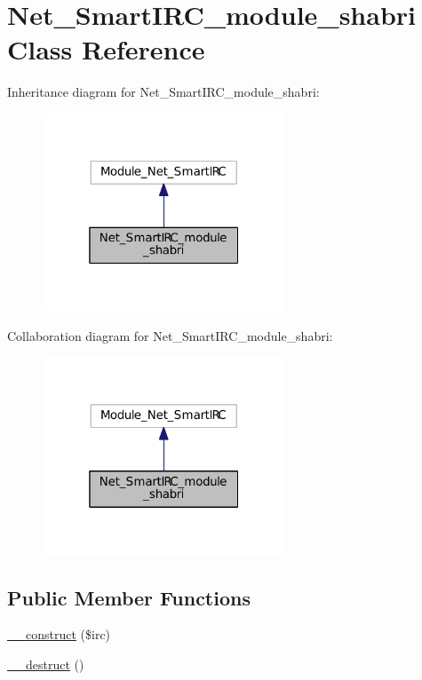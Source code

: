 \hypertarget{classNet__SmartIRC__module__shabri}{}\section{Net\+\_\+\+Smart\+I\+R\+C\+\_\+module\+\_\+shabri Class Reference}
\label{classNet__SmartIRC__module__shabri}


Inheritance diagram for Net\+\_\+\+Smart\+I\+R\+C\+\_\+module\+\_\+shabri\+:
\nopagebreak
\begin{figure}[H]
\begin{center}
\leavevmode
\includegraphics[width=205pt]{d5/d63/classNet__SmartIRC__module__shabri__inherit__graph}
\end{center}
\end{figure}


Collaboration diagram for Net\+\_\+\+Smart\+I\+R\+C\+\_\+module\+\_\+shabri\+:
\nopagebreak
\begin{figure}[H]
\begin{center}
\leavevmode
\includegraphics[width=205pt]{d4/d39/classNet__SmartIRC__module__shabri__coll__graph}
\end{center}
\end{figure}
\subsection*{Public Member Functions}
\begin{DoxyCompactItemize}
\item 
\hyperlink{classNet__SmartIRC__module__shabri_ac40c957f3dca3221a8e8efdc8bf29049}{\+\_\+\+\_\+construct} (\$irc)
\item 
\hyperlink{classNet__SmartIRC__module__shabri_ad51f5f82743d89efbe3c611d65757f0b}{\+\_\+\+\_\+destruct} ()
\end{DoxyCompactItemize}
